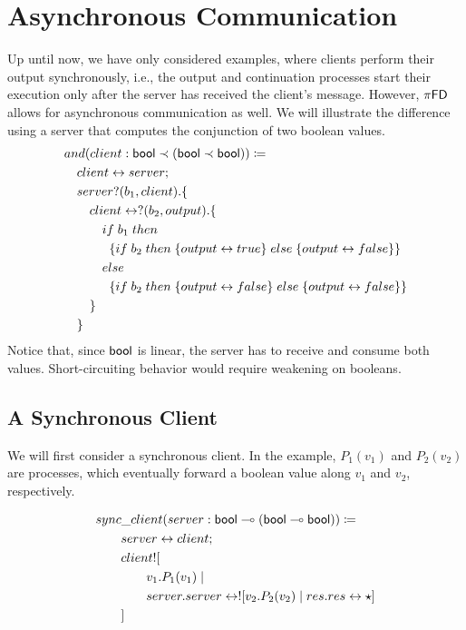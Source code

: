 \section{Asynchronous Communication} \label{sec:examples:async-communication}
Up until now, we have only considered examples, where clients perform their
output synchronously, i.e., the output and continuation processes start their execution only
after the server has received the client's message. However, $\pi\textsf{FD}$ allows
for asynchronous communication as well. We will illustrate the difference using
a server that computes the conjunction of two boolean values.
\begin{align*}
  &and(client : \textsf{bool} \prec (\textsf{bool} \prec \textsf{bool})) \coloneq \\
  &\quad client \leftrightarrow server ;\, \\
  &\quad server ? (b_1, client) . \{ \\
  &\quad \quad client \leftrightarrow ? (b_2, output) . \{ \\
  &\quad \quad \quad if \; b_1 \; then \\
  &\quad \quad \quad \; \; \{if \; b_2 \; then \; \{output \leftrightarrow true\} \; else \; \{output \leftrightarrow false\}\} \\
  &\quad \quad \quad else \\
  &\quad \quad \quad \; \; \{if \; b_2 \; then \; \{output \leftrightarrow false\} \; else \; \{output \leftrightarrow false\}\} \\
  &\quad \quad \} \\
  &\quad \} \\
\end{align*}
Notice that, since $\textsf{bool}$ is linear, the server has to receive and consume
both values. Short-circuiting behavior would require weakening on booleans.

\subsection{A Synchronous Client}
We will first consider a synchronous client. In the example, $P_1(v_1)$ and $P_2(v_2)$
are processes, which eventually forward a boolean value along $v_1$ and $v_2$, respectively.

\begin{align*}
&sync\_client(server : \textsf{bool} \multimap (\textsf{bool} \multimap \textsf{bool})) \coloneq \\
&\qquad server \leftrightarrow client ;\, \\
&\qquad client ! [ \\
&\qquad \qquad v_1 . P_1(v_1) \mid \\
&\qquad \qquad server . server \leftrightarrow ! [v_2 . P_2(v_2) \mid res . res \leftrightarrow \star] \\
&\qquad ]
\end{align*}

